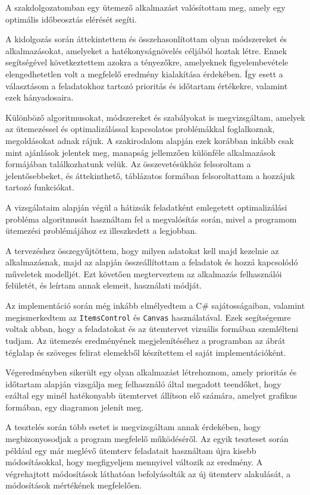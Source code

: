 
A szakdolgozatomban egy ütemező alkalmazást valósítottam meg, amely egy optimális időbeosztás elérését segíti.

A kidolgozás során áttekintettem és összehasonlítottam olyan módszereket és alkalmazásokat, amelyeket a hatékonyságnövelés céljából hoztak létre. Ennek segítségével következtettem azokra a tényezőkre, amelyeknek figyelembevétele elengedhetetlen volt a megfelelő eredmény kialakítása érdekében.
Így esett a választásom a feladatokhoz tartozó prioritás és időtartam értékekre, valamint ezek hányadosaira.

Különböző algoritmusokat, módszereket és szabályokat is megvizsgáltam, amelyek az ütemezéssel és optimalizálással kapcsolatos problémákkal foglalkoznak, megoldásokat adnak rájuk.
A szakirodalom alapján ezek korábban inkább csak mint ajánlások jelentek meg, manapság jellemzően különféle alkalmazások formájában találkozhatunk velük.
Az összevetésükhöz felsoroltam a jelentősebbeket, és áttekinthető, táblázatos formában felsoroltattam a hozzájuk tartozó funkciókat.

A vizsgálataim alapján végül a hátizsák feladatként emlegetett optimalizálási probléma algoritmusát használtam fel a megvalósítás során, mivel a programom ütemezési problémájához ez illeszkedett a legjobban.

A tervezéshez összegyűjtöttem, hogy milyen adatokat kell majd kezelnie az alkalmazásnak, majd az alapján összeállítottam a feladatok és hozzá kapcsolódó műveletek modelljét.
Ezt követően megterveztem az alkalmazás felhasználói felületét, és leírtam annak elemeit, használati módját.

Az implementáció során még inkább elmélyedtem a C\# sajátosságaiban, valamint megismerkedtem az \texttt{ItemsControl} és \texttt{Canvas} használatával. Ezek segítségemre voltak abban, hogy a feladatokat és az ütemtervet vizuális formában szemlélteni tudjam.
Az ütemezés eredményének megjelenítéséhez a programban az ábrát téglalap és szöveges felirat elemekből készítettem el saját implementációként.

Végeredményben sikerült egy olyan alkalmazást létrehoznom, amely prioritás és időtartam alapján vizsgálja meg felhasználó által megadott teendőket, hogy ezáltal egy minél hatékonyabb ütemtervet állítson elő számára, amelyet grafikus formában, egy diagramon jelenít meg.

A tesztelés során több esetet is megvizsgáltam annak érdekében, hogy megbizonyosodjak a program megfelelő működéséről. Az egyik teszteset során például egy már meglévő ütemterv feladatait használtam újra kisebb módosításokkal, hogy megfigyeljem mennyivel változik az eredmény. A végrehajtott módosítások láthatóan befolyásolták az új ütemterv alakulását, a módosítások mértékének megfelelően.

